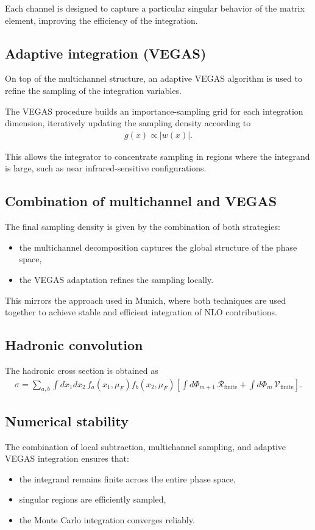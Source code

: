 Each channel is designed to capture a particular singular behavior of
the matrix element, improving the efficiency of the integration.

\subsection{Adaptive integration (VEGAS)}

On top of the multichannel structure, an adaptive VEGAS algorithm is used
to refine the sampling of the integration variables.

The VEGAS procedure builds an importance-sampling grid for each integration
dimension, iteratively updating the sampling density according to
\begin{align}
g(x) \propto |w(x)|.
\end{align}

This allows the integrator to concentrate sampling in regions where the
integrand is large, such as near infrared-sensitive configurations.

\subsection{Combination of multichannel and VEGAS}

The final sampling density is given by the combination of both strategies:
\begin{itemize}
    \item the multichannel decomposition captures the global structure
    of the phase space,
    \item the VEGAS adaptation refines the sampling locally.
\end{itemize}

This mirrors the approach used in Munich, where both techniques are used
together to achieve stable and efficient integration of NLO contributions.

\subsection{Hadronic convolution}

The hadronic cross section is obtained as
\begin{align}
\sigma =
\sum_{a,b} \int dx_1 dx_2 \,
f_a(x_1,\mu_F) f_b(x_2,\mu_F)
\left[
\int d\Phi_{m+1} \, \mathcal{R}_{\text{finite}}
+
\int d\Phi_m \, \mathcal{V}_{\text{finite}}
\right].
\end{align}

\subsection{Numerical stability}

The combination of local subtraction, multichannel sampling,
and adaptive VEGAS integration ensures that:
\begin{itemize}
    \item the integrand remains finite across the entire phase space,
    \item singular regions are efficiently sampled,
    \item the Monte Carlo integration converges reliably.
\end{itemize}